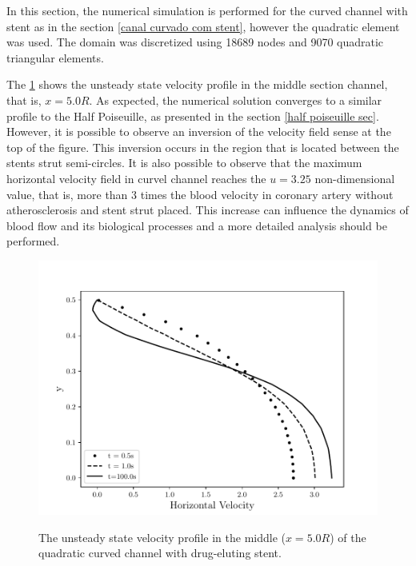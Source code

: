 In this section, the numerical simulation is performed
for the curved channel with stent as in the section 
\ref{canal curvado com stent}, however the quadratic element
was used. The domain was discretized using 18689 nodes and 
9070 quadratic triangular elements. 

\medskip 
The \ref{quad velocity evolution curved stent} shows the unsteady state 
velocity profile in the middle section channel, that is, 
$x=5.0R$. 
As expected, the numerical solution converges to a similar profile to
the Half Poiseuille, as presented in the section \ref{half poiseuille sec}. However, it is possible to observe an inversion of the velocity
field sense at the top of the figure.
This inversion occurs in the region that is
located between the stents strut semi-circles.
It is also possible to observe that the maximum horizontal velocity field 
in curvel channel reaches the $u=3.25$ non-dimensional value, that is, 
more than 3 times the blood velocity in coronary artery
without atherosclerosis and stent strut placed. 
This increase can influence the dynamics of blood flow
and its biological processes and a more detailed analysis
should be performed.

\vspace{1cm}
\begin{figure}[H]
     \caption{
The unsteady state velocity profile in the middle ($x=5.0R$) of the quadratic curved channel with drug-eluting stent.}
     \centering
     \includegraphics[scale=1]{./02_chaps/cap_solution/figure/vel_quadCurvedStrut_evol.pdf}\\
     \label{quad velocity evolution curved stent}
\end{figure}

